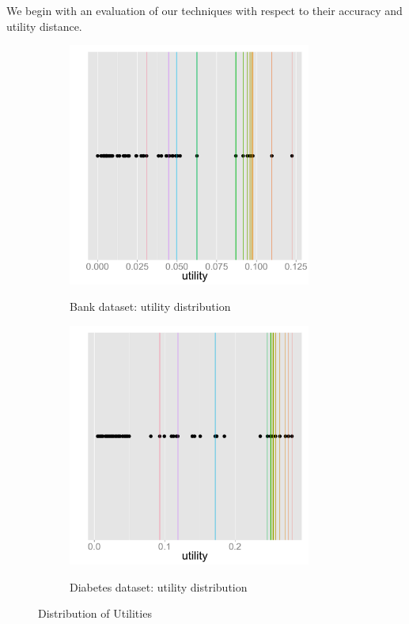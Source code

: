 We begin with an evaluation of our techniques with respect to their accuracy
and utility distance.\\

\begin{figure}[h]
	\centering
	\begin{subfigure}{1\linewidth}
		\centering
		{\includegraphics[trim = 0mm 50mm 0mm 50mm, clip, width=8cm]
		{Images/bank_utility_distribution.pdf}}
		\caption{Bank dataset: utility distribution}
		\label{fig:bank_utility_distribution}
	\end{subfigure}
	
	\begin{subfigure}{1\linewidth}
		\centering
		{\includegraphics[trim = 0mm 50mm 0mm 50mm, clip, width=8cm]
		{Images/diabetes_utility_distribution.pdf}}
		\caption{Diabetes dataset: utility distribution}
		\label{fig:diabetes_utility_distribution}
	\end{subfigure}
\label{fig:utility_distribution}
\caption{Distribution of Utilities}
\end{figure}


